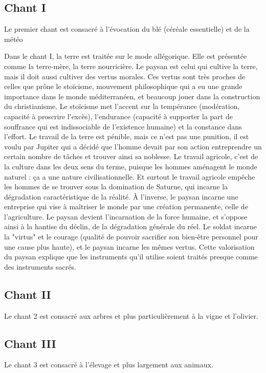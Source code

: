 \documentclass[a4paper,12pt]{book}
\begin{document}
\subsection{Chant I}
Le premier chant est consacré à l'évocation du blé (céréale essentielle) et de la météo
\par Dans le chant I, la terre est traitée sur le mode allégorique. Elle est présentée comme la terre-mère, la terre nourricière. Le paysan est celui qui cultive la terre, mais il doit aussi cultiver des vertus morales. Ces vertus sont très proches de celles que prône le stoïcisme, mouvement philosophique qui a eu une grande importance dans le monde méditerranéen, et beaucoup jouer dans la construction du christianisme. Le stoïcisme met l'accent sur la tempérance (modération, capacité à proscrire l'excès), l'endurance (capacité à supporter la part de souffrance qui est indissociable de l'existence humaine) et la constance dans l'effort. Le travail de la terre est pénible, mais ce n'est pas une punition, il est voulu par Jupiter qui a décidé que l'homme devait par son action entreprendre un certain nombre de tâches et trouver ainsi sa noblesse. Le travail agricole, c'est de la culture dans les deux sens du terme, puisque les hommes aménagent le monde naturel : ça a une nature civilisationnelle. Et surtout le travail agricole empêche les hommes de se trouver sous la domination de Saturne, qui incarne la dégradation caractéristique de la réalité. À l'inverse, le paysan incarne une entreprise qui vise à maîtriser le monde par une création permanente, celle de l'agriculture. Le paysan devient l'incarnation de la force humaine, et s'oppose ainsi à la hantise du déclin, de la dégradation générale du réel. Le soldat incarne la "virtus" et le courage (qualité de pouvoir sacrifier son bien-être personnel pour une cause plus haute), et le paysan incarne les mêmes vertus. Cette valorisation du paysan explique que les instruments qu'il utilise soient traités presque comme des instruments sacrés.

\subsection{Chant II}
Le chant 2 est consacré aux arbres et plus particulièrement à la vigne et l'olivier.

\subsection{Chant III}
Le chant 3 est consacré à l'élevage et plus largement aux animaux.
\end{document}
